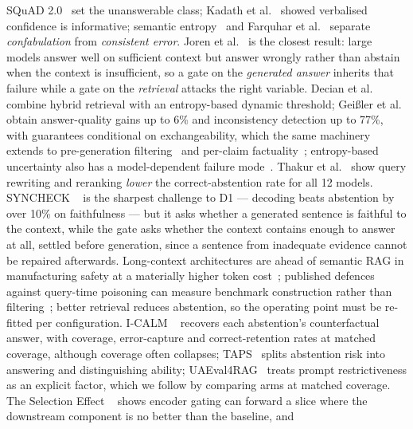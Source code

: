 \documentclass[conference]{IEEEtran}
\begin{document}
SQuAD 2.0~\cite{rajpurkar2018squad2} set the unanswerable class; Kadath et
al.~\cite{kadavath2022know} showed verbalised confidence is informative;
semantic entropy~\cite{kuhn2023semantic} and Farquhar et
al.~\cite{farquhar2024semantic} separate \emph{confabulation} from
\emph{consistent error}. Joren et al.~\cite{joren2024sufficient} is the
closest result: large models answer well on sufficient context but answer
wrongly rather than abstain when the context is insufficient, so a gate on the
\emph{generated answer} inherits that failure while a gate on the
\emph{retrieval} attacks the right variable. Decian et
al.~\cite{decian2026dynamic} combine hybrid retrieval with an entropy-based
dynamic threshold; Gei{\ss}ler et al.~\cite{geissler2026dependable} obtain
answer-quality gains up to 6\% and inconsistency detection up to 77\%, with
guarantees conditional on exchangeability, which the same machinery extends to
pre-generation filtering~\cite{chen2026principled} and per-claim
factuality~\cite{feng2025conformal,claimconformal2026}; entropy-based
uncertainty also has a model-dependent failure mode~\cite{phillips2026entropy}.
Thakur et al.~\cite{thakur2026declinecraft} show query rewriting and reranking
\emph{lower} the correct-abstention rate for all 12 models. SYNCHECK
~\cite{syncheck2024} is the sharpest challenge to D1 --- decoding beats
abstention by over 10\% on faithfulness --- but it asks whether a generated
sentence is faithful to the context, while the gate asks whether the context
contains enough to answer at all, settled before generation, since a sentence
from inadequate evidence cannot be repaired afterwards. Long-context
architectures are ahead of semantic RAG in manufacturing safety at a materially
higher token cost~\cite{longcontext2026tokentax}; published defences against
query-time poisoning can measure benchmark construction rather than
filtering~\cite{ranking2026notdeciding}; better retrieval reduces abstention,
so the operating point must be re-fitted per configuration. I-CALM
~\cite{zong2026icalm} recovers each abstention's counterfactual answer, with
coverage, error-capture and correct-retention rates at matched coverage,
although coverage often collapses; TAPS~\cite{zhang2026taps} splits abstention
risk into answering and distinguishing ability; UAEval4RAG~\cite{peng2025uaeval4rag}
treats prompt restrictiveness as an explicit factor, which we follow by
comparing arms at matched coverage. The Selection Effect
~\cite{tikhomirov2026selection} shows encoder gating can forward a slice where
the downstream component is no better than the baseline, and
\end{document}
